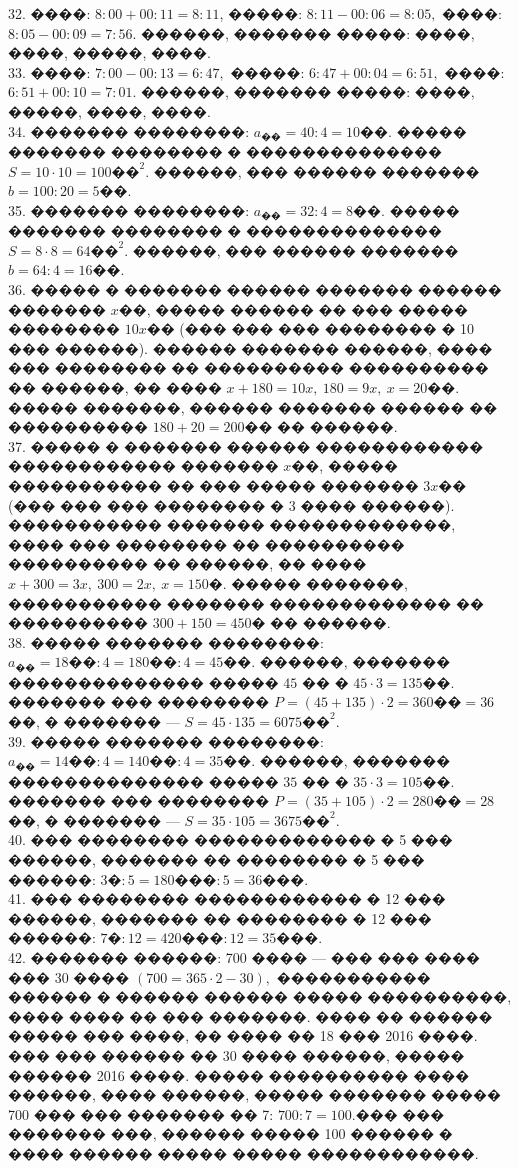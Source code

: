 \documentclass[12pt]{article}
\begin{document}
32. ����: $8:00+00:11=8:11$, �����: $8:11-00:06=8:05,$ ����: $8:05-00:09=7:56.$ ������, ������� �����: ����, ����, �����, ����.\\
33. ����: $7:00-00:13=6:47,$ �����: $6:47+00:04=6:51,$ ����: $6:51+00:10=7:01.$ ������, ������� �����: ����, �����, ����, ����.\\
34. ������� ��������: $a_{\text{��}}=40:4=10$��. ����� ������� �������� � �������������� $S=10\cdot10=100\text{��}^2.$ ������, ��� ������ ������� $b=100:20=5$��.\\
35. ������� ��������: $a_{\text{��}}=32:4=8$��. ����� ������� �������� � �������������� $S=8\cdot8=64\text{��}^2.$ ������, ��� ������ ������� $b=64:4=16$��.\\
36. ����� � ������� ������ ������� ������ ������� $x$��, ����� ������ �� ��� ����� �������� $10x$�� (��� ��� ��� �������� � 10 ��� ������). ������ ������� ������, ���� ��� �������� �� ���������� ���������� �� ������, �� ���� $x+180=10x,\ 180=9x,\ x=20$��. ����� �������, ������ ������� ������ �� ���������� $180+20=200$�� �� ������.\\
37. ����� � ������� ������ ������������ ������������ ������� $x$��, ����� ����������� �� ��� ����� ������� $3x$�� (��� ��� ��� �������� � 3 ���� ������). ����������� ������� �������������, ���� ��� �������� �� ���������� ���������� �� ������, �� ���� $x+300=3x,\ 300=2x,\ x=150$�. ����� �������, ����������� ������� ������������� �� ���������� $300+150=450$� �� ������.\\
38. ����� ������� ��������: $a_{\text{��}}=18\text{��}:4=180\text{��}:4=45$��. ������, ������� �������������� ����� $45$ �� � $45\cdot3=135$��. ������� ��� �������� $P=(45+135)\cdot2=360\text{��}=36$��, � ������� --- $S=45\cdot135=6075\text{��}^2.$\\
39. ����� ������� ��������: $a_{\text{��}}=14\text{��}:4=140\text{��}:4=35$��. ������, ������� �������������� ����� $35$ �� � $35\cdot3=105$��. ������� ��� �������� $P=(35+105)\cdot2=280\text{��}=28$��, � ������� --- $S=35\cdot105=3675\text{��}^2.$\\
40. ��� �������� ������������� � 5 ��� ������, ������� �� �������� � 5 ��� ������: $3\text{�}:5=180\text{���}:5=36$���.\\
41. ��� �������� ������������ � 12 ��� ������, ������� �� �������� � 12 ��� ������: $7\text{�}:12=420\text{���}:12=35$���.\\
42. ������� ������: 700 ���� --- ��� ��� ���� ��� 30 ���� $(700=365\cdot2-30),$ ����������� ������ � ������ ������ ����� ����������, ���� ���� �� ��� �������. ���� �� ������ ����� ��� ����, �� ���� �� 18 ��� 2016 ����. ��� ��� ������ �� 30 ���� ������, ����� ������ 2016 ����. ����� ���������� ���� ������, ���� ������, ����� ������� ����� 700 ��� ��� ������� �� 7: $700:7=100.$��� ��� ������� ���, ������ ����� 100 ������ � ���� ������ ����� ����� ������������.\\
\end{document}
